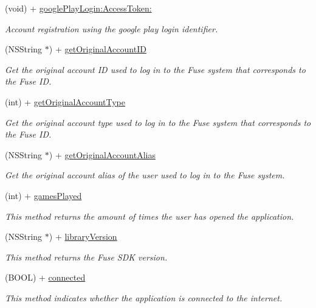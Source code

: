 \begin{DoxyCompactItemize}
(void) + \hyperlink{interface_fuse_s_d_k_a826545aa45a550cbc10cc98137ee5898}{google\+Play\+Login\+:\+Access\+Token\+:}
\begin{DoxyCompactList}\small\item\em Account registration using the google play login identifier. \end{DoxyCompactList}\item 
(N\+S\+String $\ast$) + \hyperlink{interface_fuse_s_d_k_a49b43f13a0efee7d2af60197d0ae341c}{get\+Original\+Account\+I\+D}
\begin{DoxyCompactList}\small\item\em Get the original account I\+D used to log in to the Fuse system that corresponds to the Fuse I\+D. \end{DoxyCompactList}\item 
(int) + \hyperlink{interface_fuse_s_d_k_a0571f2d960109dc9bff59c6575bf2534}{get\+Original\+Account\+Type}
\begin{DoxyCompactList}\small\item\em Get the original account type used to log in to the Fuse system that corresponds to the Fuse I\+D. \end{DoxyCompactList}\item 
(N\+S\+String $\ast$) + \hyperlink{interface_fuse_s_d_k_ab49bb189bd1ebaf871f24a7c4e4b5290}{get\+Original\+Account\+Alias}
\begin{DoxyCompactList}\small\item\em Get the original account alias of the user used to log in to the Fuse system. \end{DoxyCompactList}\item 
(int) + \hyperlink{interface_fuse_s_d_k_afb8604dccdbf7c0b507074a649b75da9}{games\+Played}
\begin{DoxyCompactList}\small\item\em This method returns the amount of times the user has opened the application. \end{DoxyCompactList}\item 
(N\+S\+String $\ast$) + \hyperlink{interface_fuse_s_d_k_a56f5fc3ba2e03d3dbe9d681b3500108a}{library\+Version}
\begin{DoxyCompactList}\small\item\em This method returns the Fuse S\+D\+K version. \end{DoxyCompactList}\item 
(B\+O\+O\+L) + \hyperlink{interface_fuse_s_d_k_a6db77bb2cb4ba38f58666edfa470f7bd}{connected}
\begin{DoxyCompactList}\small\item\em This method indicates whether the application is connected to the internet. \end{DoxyCompactList}\item 

\end{DoxyCompactItemize}
